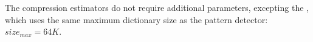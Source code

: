 The compression estimators do not require additional parameters, excepting the , which uses the same maximum dictionary size as the  pattern detector: \(size_{max} = 64K\).


